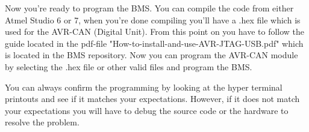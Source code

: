 
Now you're ready to program the BMS. You can compile the code from either Atmel Studio 6 or 7, when you're done compiling you'll have a .hex file which is used for the AVR-CAN (Digital Unit). From this point on you have to follow the guide located in the pdf-file "How-to-install-and-use-AVR-JTAG-USB.pdf" which is located in the BMS repository. Now you can program the AVR-CAN module by selecting the .hex file or other valid files and program the BMS.

You can always confirm the programming by looking at the hyper terminal printouts and see if it matches your expectations. However, if it does not match your expectations you will have to debug the source code or the hardware to resolve the problem.

